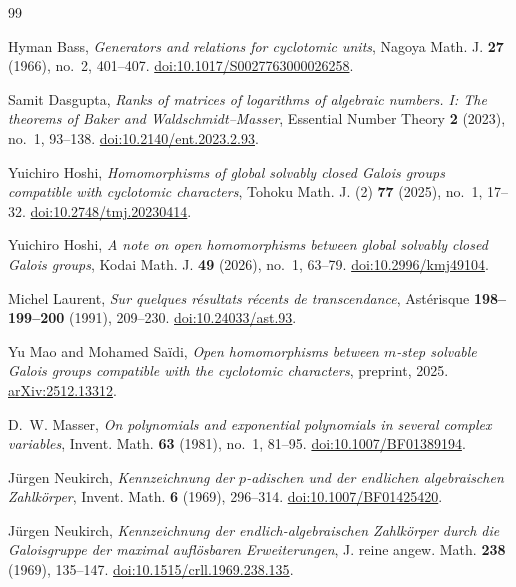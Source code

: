 \begin{thebibliography}{99}

Hyman Bass,
\emph{Generators and relations for cyclotomic units},
Nagoya Math. J. \textbf{27} (1966), no.~2, 401--407.
\href{https://doi.org/10.1017/S0027763000026258}{doi:10.1017/S0027763000026258}.

Samit Dasgupta,
\emph{Ranks of matrices of logarithms of algebraic numbers. I: The theorems of Baker and Waldschmidt--Masser},
Essential Number Theory \textbf{2} (2023), no.~1, 93--138.
\href{https://doi.org/10.2140/ent.2023.2.93}{doi:10.2140/ent.2023.2.93}.

Yuichiro Hoshi,
\emph{Homomorphisms of global solvably closed Galois groups compatible with cyclotomic characters},
Tohoku Math. J. (2) \textbf{77} (2025), no.~1, 17--32.
\href{https://doi.org/10.2748/tmj.20230414}{doi:10.2748/tmj.20230414}.

Yuichiro Hoshi,
\emph{A note on open homomorphisms between global solvably closed Galois groups},
Kodai Math. J. \textbf{49} (2026), no.~1, 63--79.
\href{https://doi.org/10.2996/kmj49104}{doi:10.2996/kmj49104}.

Michel Laurent,
\emph{Sur quelques r\'esultats r\'ecents de transcendance},
Ast\'erisque \textbf{198--199--200} (1991), 209--230.
\href{https://doi.org/10.24033/ast.93}{doi:10.24033/ast.93}.

Yu Mao and Mohamed Sa\"idi,
\emph{Open homomorphisms between $m$-step solvable Galois groups compatible with the cyclotomic characters},
preprint, 2025.
\href{https://arxiv.org/abs/2512.13312}{arXiv:2512.13312}.

D.~W. Masser,
\emph{On polynomials and exponential polynomials in several complex variables},
Invent. Math. \textbf{63} (1981), no.~1, 81--95.
\href{https://doi.org/10.1007/BF01389194}{doi:10.1007/BF01389194}.

J\"urgen Neukirch,
\emph{Kennzeichnung der $p$-adischen und der endlichen algebraischen Zahlk\"orper},
Invent. Math. \textbf{6} (1969), 296--314.
\href{https://doi.org/10.1007/BF01425420}{doi:10.1007/BF01425420}.

J\"urgen Neukirch,
\emph{Kennzeichnung der endlich-algebraischen Zahlk\"orper durch die Galoisgruppe der maximal aufl\"osbaren Erweiterungen},
J. reine angew. Math. \textbf{238} (1969), 135--147.
\href{https://doi.org/10.1515/crll.1969.238.135}{doi:10.1515/crll.1969.238.135}.


\end{thebibliography}
